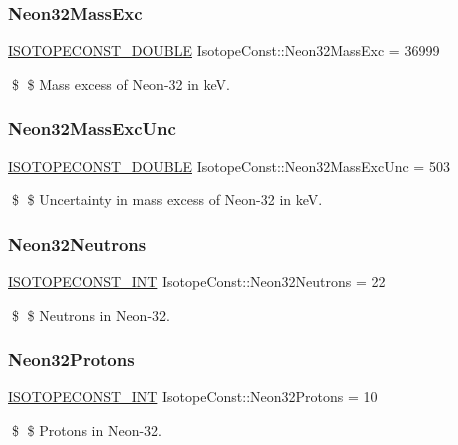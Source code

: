 \subsubsection{\texorpdfstring{Neon32\+Mass\+Exc}{Neon32MassExc}}
{\footnotesize\ttfamily \mbox{\hyperlink{group___isotope_const-_macros_ga8f45a7272ce02c0b4c65c44636ed719a}{I\+S\+O\+T\+O\+P\+E\+C\+O\+N\+S\+T\+\_\+\+D\+O\+U\+B\+LE}} Isotope\+Const\+::\+Neon32\+Mass\+Exc = 36999}

\$ \$ Mass excess of Neon-\/32 in keV. \mbox{\label{group___isotope_const-_neon-_ne32_ga7c937b973738dce54a61355ca40241fb}} 
\subsubsection{\texorpdfstring{Neon32\+Mass\+Exc\+Unc}{Neon32MassExcUnc}}
{\footnotesize\ttfamily \mbox{\hyperlink{group___isotope_const-_macros_ga8f45a7272ce02c0b4c65c44636ed719a}{I\+S\+O\+T\+O\+P\+E\+C\+O\+N\+S\+T\+\_\+\+D\+O\+U\+B\+LE}} Isotope\+Const\+::\+Neon32\+Mass\+Exc\+Unc = 503}

\$ \$ Uncertainty in mass excess of Neon-\/32 in keV. \mbox{\label{group___isotope_const-_neon-_ne32_ga5e846bbd0eb998e702ce6f77fc617552}} 
\subsubsection{\texorpdfstring{Neon32\+Neutrons}{Neon32Neutrons}}
{\footnotesize\ttfamily \mbox{\hyperlink{group___isotope_const-_macros_ga5f18360b3e99483a35c32d789e62621c}{I\+S\+O\+T\+O\+P\+E\+C\+O\+N\+S\+T\+\_\+\+I\+NT}} Isotope\+Const\+::\+Neon32\+Neutrons = 22}

\$ \$ Neutrons in Neon-\/32. \mbox{\label{group___isotope_const-_neon-_ne32_gad8efc12e76bb74394a4ba20f01ac3645}} 
\subsubsection{\texorpdfstring{Neon32\+Protons}{Neon32Protons}}
{\footnotesize\ttfamily \mbox{\hyperlink{group___isotope_const-_macros_ga5f18360b3e99483a35c32d789e62621c}{I\+S\+O\+T\+O\+P\+E\+C\+O\+N\+S\+T\+\_\+\+I\+NT}} Isotope\+Const\+::\+Neon32\+Protons = 10}

\$ \$ Protons in Neon-\/32. 